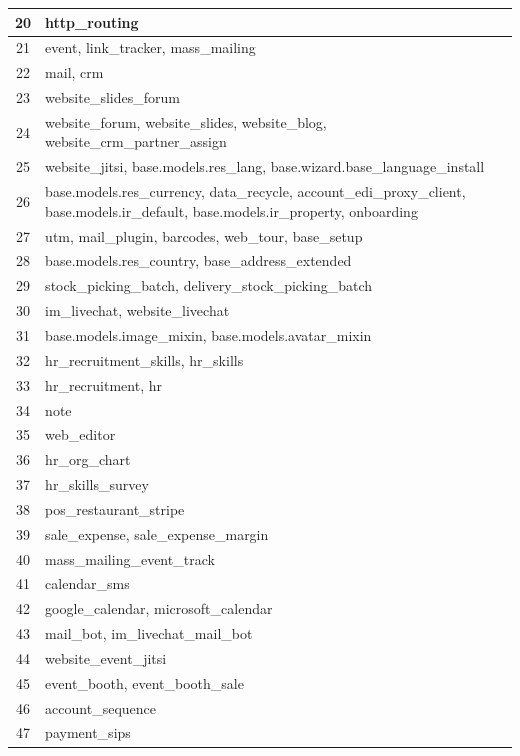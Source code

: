 \begin{small}
\begin{longtable}{|c|p{14cm}|}
20 & http{\_}routing \\ \hline
21 & event, link{\_}tracker, mass{\_}mailing \\ \hline
22 & mail, crm \\ \hline
23 & website{\_}slides{\_}forum \\ \hline
24 & website{\_}forum, website{\_}slides, website{\_}blog, website{\_}crm{\_}partner{\_}assign \\ \hline
25 & website{\_}jitsi, base.models.res{\_}lang, base.wizard.base{\_}language{\_}install \\ \hline
26 & base.models.res{\_}currency, data{\_}recycle, account{\_}edi{\_}proxy{\_}client, base.models.ir{\_}default, base.models.ir{\_}property, onboarding \\ \hline
27 & utm, mail{\_}plugin, barcodes, web{\_}tour, base{\_}setup \\ \hline
28 & base.models.res{\_}country, base{\_}address{\_}extended \\ \hline
29 & stock{\_}picking{\_}batch, delivery{\_}stock{\_}picking{\_}batch \\ \hline
30 & im{\_}livechat, website{\_}livechat \\ \hline
31 & base.models.image{\_}mixin, base.models.avatar{\_}mixin \\ \hline
32 & hr{\_}recruitment{\_}skills, hr{\_}skills \\ \hline
33 & hr{\_}recruitment, hr \\ \hline
34 & note \\ \hline
35 & web{\_}editor \\ \hline
36 & hr{\_}org{\_}chart \\ \hline
37 & hr{\_}skills{\_}survey \\ \hline
38 & pos{\_}restaurant{\_}stripe \\ \hline
39 & sale{\_}expense, sale{\_}expense{\_}margin \\ \hline
40 & mass{\_}mailing{\_}event{\_}track \\ \hline
41 & calendar{\_}sms \\ \hline
42 & google{\_}calendar, microsoft{\_}calendar \\ \hline
43 & mail{\_}bot, im{\_}livechat{\_}mail{\_}bot \\ \hline
44 & website{\_}event{\_}jitsi \\ \hline
45 & event{\_}booth, event{\_}booth{\_}sale \\ \hline
46 & account{\_}sequence \\ \hline
47 & payment{\_}sips \\ \hline

\end{longtable}
\end{small}
